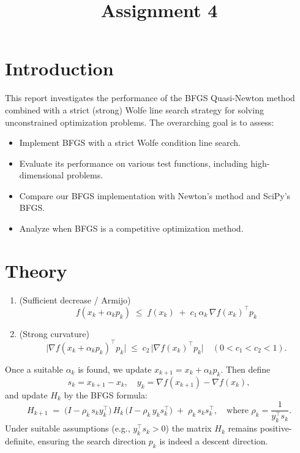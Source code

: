 \documentclass[12pt]{article}
\title{Assignment 4}
\begin{document}
\maketitle

\section{Introduction}


This report investigates the performance of the BFGS Quasi-Newton method combined with a strict (strong) Wolfe line search strategy for solving unconstrained optimization problems. The overarching goal is to assess:
\begin{itemize}
    \item Implement BFGS with a strict Wolfe condition line search.
    \item Evaluate its performance on various test functions, including high-dimensional problems.
    \item Compare our BFGS implementation with Newton's method and SciPy's BFGS.
    \item Analyze when BFGS is a competitive optimization method.
\end{itemize}



\section{Theory}


\begin{enumerate}
    \item (Sufficient decrease / Armijo) 
    \[
       f(x_k + \alpha_k p_k) \;\le\; f(x_k) \;+\; c_1 \,\alpha_k\, \nabla f(x_k)^\top p_k
    \]
    \item (Strong curvature) 
    \[
       \bigl|\nabla f(x_k + \alpha_k p_k)^\top p_k\bigr| \;\le\; c_2\, \bigl|\nabla f(x_k)^\top p_k\bigr|\quad(0 < c_1 < c_2 < 1).
    \]
\end{enumerate}
Once a suitable $\alpha_k$ is found, we update $x_{k+1} = x_k + \alpha_k p_k$. Then define 
\[
s_k = x_{k+1} - x_k, \quad
y_k = \nabla f(x_{k+1}) - \nabla f(x_k),
\]
and update $H_k$ by the BFGS formula:
\[
   H_{k+1} \;=\; \bigl(I - \rho_k\, s_k y_k^\top\bigr)\,H_k \,\bigl(I - \rho_k\, y_k s_k^\top\bigr) \;+\; \rho_k\, s_k s_k^\top,
   \quad \text{where } \rho_k = \frac{1}{y_k^\top s_k}.
\]
Under suitable assumptions (e.g., $y_k^\top s_k > 0$) the matrix $H_k$ remains positive-definite, ensuring the search direction $p_k$ is indeed a descent direction.
\end{document}
